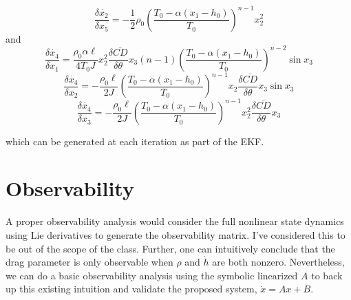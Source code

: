 \documentclass{article}
\begin{document}
  \begin{equation}
    \frac{\delta \dot{x_2}}{\delta x_5} = -\frac{1}{2}\rho_0 \left( \frac{T_0-\alpha \left( x_1 - h_0\right)}{T_0} \right)^{n-1} x_2^2
  \end{equation}
  and
  \begin{equation}
    \frac{\delta \dot{x_4}}{\delta x_1} = \frac{\rho_0 \alpha \ell}{4 T_0 J}x_2^2 \frac{\delta \bar{CD}}{\delta \theta} x_3 \left(n-1 \right) \left( \frac{T_0-\alpha \left( x_1 - h_0\right)}{T_0} \right)^{n-2} \sin x_3
  \end{equation}
  \begin{equation}
    \frac{\delta \dot{x_4}}{\delta x_2} = -\frac{\rho_0 \ell}{2J}\left( \frac{T_0-\alpha \left( x_1 - h_0\right)}{T_0} \right)^{n-1} x_2 \frac{\delta \bar{CD}}{\delta \theta} x_3 \sin x_3
  \end{equation}
  \begin{equation}
    \frac{\delta \dot{x_4}}{\delta x_3} = -\frac{\rho_0 \ell}{2J}\left( \frac{T_0-\alpha \left( x_1 - h_0\right)}{T_0} \right)^{n-1} x_2^2 \frac{\delta \bar{CD}}{\delta \theta} x_3
  \end{equation}

  which can be generated at each iteration as part of the EKF.

  \section{Observability}

  A proper observability analysis would consider the full nonlinear state dynamics using Lie derivatives to generate the observability matrix. I've considered this to be out of the scope of the class. Further, one can intuitively conclude that the drag parameter is only observable when $\rho$ and $\dot{h}$ are both nonzero. Nevertheless, we can do a basic observability analysis using the symbolic linearized $A$ to back up this existing intuition and validate the proposed system, $\dot{x}=Ax+B$.
\end{document}
